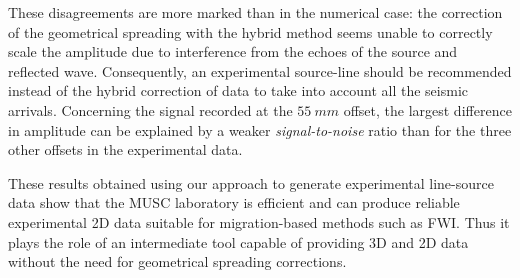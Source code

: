 \documentclass[manuscript,revised]{geophysics}
\begin{document}

\noindent These disagreements are more marked than in the numerical case: the correction of the geometrical spreading with the hybrid method seems unable to correctly scale the amplitude due to interference from the echoes of the source and reflected wave. Consequently, an experimental source-line should be recommended instead of the hybrid correction of data to take into account all the seismic arrivals. Concerning the signal recorded at the $55\ mm$ offset, the largest difference in amplitude can be explained by a weaker \textit{signal-to-noise} ratio than for the three other offsets in the experimental data. 

\noindent These results obtained using our approach to generate experimental line-source data show that the MUSC laboratory is efficient and can produce reliable experimental 2D data suitable for migration-based methods such as FWI. Thus it plays the role of an intermediate tool capable of providing 3D and 2D data without the need for geometrical spreading corrections.
\end{document}
